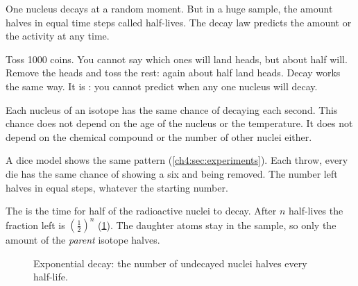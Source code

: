 \begin{bigidea}
One nucleus decays at a random moment. But in a huge sample, the amount halves in
equal time steps called half-lives. The decay law predicts the amount or the
activity at any time.
\end{bigidea}

\begin{keywords}
\end{keywords}

Toss 1000 coins. You cannot say which ones will land heads, but about half will.
Remove the heads and toss the rest: again about half land heads. Decay works the
same way. It is : you cannot predict when any one nucleus will decay.

Each nucleus of an isotope has the same chance of decaying each second. This chance
does not depend on the age of the nucleus or the temperature. It does not depend on
the chemical compound or the number of other nuclei either.

A dice model shows the same pattern (\cref{ch4:sec:experiments}). Each throw, every
die has the same chance of showing a six and being removed. The number left halves
in equal steps, whatever the starting number.

The  is the time for half of the radioactive nuclei to decay. After
$n$ half-lives the fraction left is $\left(\tfrac{1}{2}\right)^{n}$
(\cref{ch4:fig:decay}). The daughter atoms stay in the sample, so only the amount of
the \emph{parent} isotope halves.

\begin{figure}
  \centering
  \caption{Exponential decay: the number of undecayed nuclei halves every half-life.}
  \label{ch4:fig:decay}
\end{figure}

